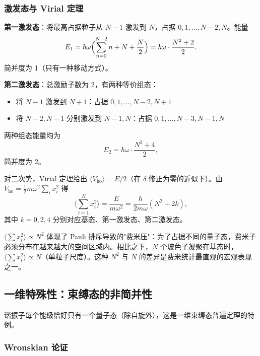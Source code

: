 \subsubsection{激发态与 Virial 定理}

\textbf{第一激发态}：将最高占据粒子从 $N-1$ 激发到 $N$，占据 $0,1,\dots,N-2,N$。能量
\[
E_1 = \hbar\omega\Bigl(\sum_{n=0}^{N-2}n + N + \frac{N}{2}\Bigr)
= \hbar\omega\cdot\frac{N^2+2}{2}.
\]
简并度为 1（只有一种移动方式）。

\textbf{第二激发态}：总激励子数为 2，有两种等价组态：
\begin{itemize}[nosep]
    \item 将 $N-1$ 激发到 $N+1$：占据 $0,1,\dots,N-2,N+1$
    \item 将 $N-2,N-1$ 分别激发到 $N-1,N$：占据 $0,1,\dots,N-3,N-1,N$
\end{itemize}
两种组态能量均为
\[
E_2 = \hbar\omega\cdot\frac{N^2+4}{2},
\]
简并度为 2。

对二次势，Virial 定理给出 $\langle V_\text{ho}\rangle = E/2$（在 $\delta$ 修正为零的近似下）。由 $V_\text{ho} = \frac12m\omega^2\sum_i x_i^2$ 得
\begin{equation}
\boxed{\Big\langle\sum_{i=1}^N x_i^2\Big\rangle = \frac{E}{m\omega^2}
= \frac{\hbar}{2m\omega}(N^2 + 2k),}
\end{equation}
其中 $k=0,2,4$ 分别对应基态、第一激发态、第二激发态。

\begin{insightbox}[费米压与空间扩展]
$\langle\sum x_i^2\rangle \propto N^2$ 体现了 Pauli 排斥导致的"费米压"：为了占据不同的量子态，费米子必须分布在越来越大的空间区域内。相比之下，$N$ 个玻色子凝聚在基态时，$\langle\sum x_i^2\rangle \propto N$（单粒子尺度）。这种 $N^2$ 与 $N$ 的差异是费米统计最直观的宏观表现之一。
\end{insightbox}

\subsection{一维特殊性：束缚态的非简并性}

谐振子每个能级恰好只有一个量子态（除自旋外），这是一维束缚态普遍定理的特例。

\subsubsection{Wronskian 论证}

